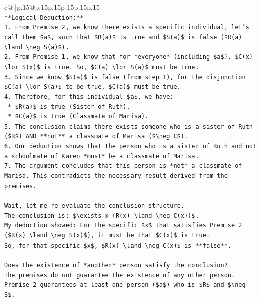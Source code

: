 \documentclass{article}
\begin{document}
{\begin{supertabular}{c@{$\;$}|p{.15\linewidth}@{}p{.15\linewidth}p{.15\linewidth}p{.15\linewidth}p{.15\linewidth}p{.15\linewidth}}
{{{\\ 
\texttt{**Logical Deduction:**} \\
\texttt{1.  From Premise 2, we know there exists a specific individual, let's call them \$a\$, such that \$R(a)\$ is true and \$S(a)\$ is false (\$R(a) \textbackslash{}land \textbackslash{}neg S(a)\$).} \\
\texttt{2.  From Premise 1, we know that for *everyone* (including \$a\$), \$C(x) \textbackslash{}lor S(x)\$ is true. So, \$C(a) \textbackslash{}lor S(a)\$ must be true.} \\
\texttt{3.  Since we know \$S(a)\$ is false (from step 1), for the disjunction \$C(a) \textbackslash{}lor S(a)\$ to be true, \$C(a)\$ must be true.} \\
\texttt{4.  Therefore, for this individual \$a\$, we have:} \\
\texttt{    *   \$R(a)\$ is true (Sister of Ruth).} \\
\texttt{    *   \$C(a)\$ is true (Classmate of Marisa).} \\
\texttt{5.  The conclusion claims there exists someone who is a sister of Ruth (\$R\$) AND **not** a classmate of Marisa (\$\textbackslash{}neg C\$).} \\
\texttt{6.  Our deduction shows that the person who is a sister of Ruth and not a schoolmate of Karen *must* be a classmate of Marisa.} \\
\texttt{7.  The argument concludes that this person is *not* a classmate of Marisa. This contradicts the necessary result derived from the premises.} \\
\\ 
\texttt{Wait, let me re{-}evaluate the conclusion structure.} \\
\texttt{The conclusion is: \$\textbackslash{}exists x (R(x) \textbackslash{}land \textbackslash{}neg C(x))\$.} \\
\texttt{My deduction showed: For the specific \$x\$ that satisfies Premise 2 (\$R(x) \textbackslash{}land \textbackslash{}neg S(x)\$), it must be that \$C(x)\$ is true.} \\
\texttt{So, for that specific \$x\$, \$R(x) \textbackslash{}land \textbackslash{}neg C(x)\$ is **false**.} \\
\\ 
\texttt{Does the existence of *another* person satisfy the conclusion?} \\
\texttt{The premises do not guarantee the existence of any other person.} \\
\texttt{Premise 2 guarantees at least one person (\$a\$) who is \$R\$ and \$\textbackslash{}neg S\$.} \\
}}}
\end{supertabular}}
\end{document}

